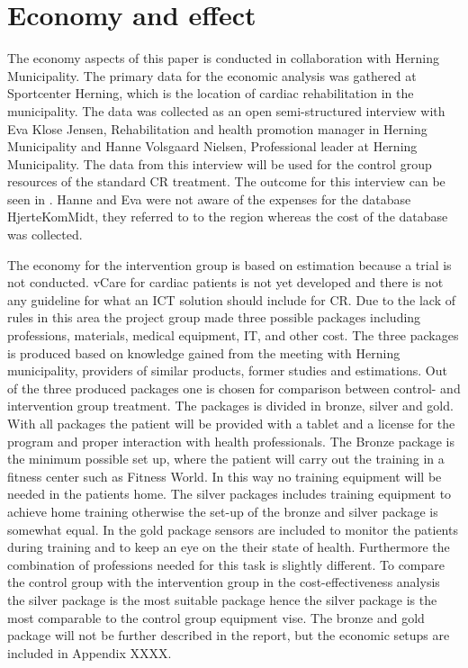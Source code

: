 \section{Economy and effect}

The economy aspects of this paper is conducted in collaboration with Herning Municipality. The primary data for the economic analysis was gathered at Sportcenter Herning, which is the location of cardiac rehabilitation in the municipality. The data was collected as an open semi-structured interview with Eva Klose Jensen, Rehabilitation and health promotion manager in Herning Municipality and Hanne Volsgaard Nielsen, Professional leader at Herning Municipality. The data from this interview will be used for the control group resources of the standard CR treatment. The outcome for this interview can be seen in . Hanne and Eva were not aware of the expenses for the database HjerteKomMidt, they referred to to the region whereas the cost of the database was collected\cite{hjerteKomMidt}.

The economy for the intervention group is based on estimation because a trial is not conducted. vCare for cardiac patients is not yet developed and there is not any guideline for what an ICT solution should include for CR. Due to the lack of rules in this area the project group made three possible packages including professions, materials, medical equipment, IT, and other cost. The three packages is produced based on knowledge gained from the meeting with Herning municipality, providers of similar products, former studies and estimations. Out of the three produced packages one is chosen for comparison between control- and intervention group treatment. 
The packages is divided in bronze, silver and gold. With all packages the patient will be provided with a tablet and a license for the program and proper interaction with health professionals. 
The Bronze package is the minimum possible set up, where the patient will carry out the training in a fitness center such as Fitness World. In this way no training equipment will be needed in the patients home. 
The silver packages includes training equipment to achieve home training otherwise the set-up of the bronze and silver package is somewhat equal. 
In the gold package sensors are included to monitor the patients during training and to keep an eye on the their state of health. Furthermore the combination of professions needed for this task is slightly different. 
To compare the control group with the intervention group in the cost-effectiveness analysis the silver package is the most suitable package hence the silver package is the most comparable to the control group equipment vise. The bronze and gold package will not be further described in the report, but the economic setups are included in Appendix XXXX.

